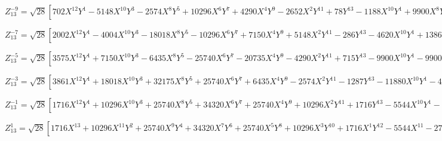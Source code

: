 \documentclass[10pt,landscape]{article}
\begin{document}
\vspace{1.2 mm}
\noindent $ Z^{-9}_{13} = \sqrt{28} [702X^{12}Y^{1} -5148X^{10}Y^{3} -2574X^{8}Y^{5} +10296X^{6}Y^{7} +4290X^{4}Y^{9} -2652X^{2}Y^{11} +78Y^{13} -1188X^{10}Y^{1} +9900X^{8}Y^{3} -5544X^{6}Y^{5} -11880X^{4}Y^{7} +4620X^{2}Y^{9} -132Y^{11} +495X^{8}Y^{1} -4620X^{6}Y^{3} +6930X^{4}Y^{5} -1980X^{2}Y^{7} +55Y^{9}] $

\vspace{1.2 mm}
\noindent $ Z^{-7}_{13} = \sqrt{28} [2002X^{12}Y^{1} -4004X^{10}Y^{3} -18018X^{8}Y^{5} -10296X^{6}Y^{7} +7150X^{4}Y^{9} +5148X^{2}Y^{11} -286Y^{13} -4620X^{10}Y^{1} +13860X^{8}Y^{3} +27720X^{6}Y^{5} -3960X^{4}Y^{7} -12540X^{2}Y^{9} +660Y^{11} +3465X^{8}Y^{1} -13860X^{6}Y^{3} -6930X^{4}Y^{5} +9900X^{2}Y^{7} -495Y^{9} -840X^{6}Y^{1} +4200X^{4}Y^{3} -2520X^{2}Y^{5} +120Y^{7}] $

\vspace{1.2 mm}
\noindent $ Z^{-5}_{13} = \sqrt{28} [3575X^{12}Y^{1} +7150X^{10}Y^{3} -6435X^{8}Y^{5} -25740X^{6}Y^{7} -20735X^{4}Y^{9} -4290X^{2}Y^{11} +715Y^{13} -9900X^{10}Y^{1} -9900X^{8}Y^{3} +27720X^{6}Y^{5} +43560X^{4}Y^{7} +13860X^{2}Y^{9} -1980Y^{11} +9900X^{8}Y^{1} -27720X^{4}Y^{5} -15840X^{2}Y^{7} +1980Y^{9} -4200X^{6}Y^{1} +4200X^{4}Y^{3} +7560X^{2}Y^{5} -840Y^{7} +630X^{4}Y^{1} -1260X^{2}Y^{3} +126Y^{5}] $

\vspace{1.2 mm}
\noindent $ Z^{-3}_{13} = \sqrt{28} [3861X^{12}Y^{1} +18018X^{10}Y^{3} +32175X^{8}Y^{5} +25740X^{6}Y^{7} +6435X^{4}Y^{9} -2574X^{2}Y^{11} -1287Y^{13} -11880X^{10}Y^{1} -43560X^{8}Y^{3} -55440X^{6}Y^{5} -23760X^{4}Y^{7} +3960X^{2}Y^{9} +3960Y^{11} +13860X^{8}Y^{1} +36960X^{6}Y^{3} +27720X^{4}Y^{5} -4620Y^{9} -7560X^{6}Y^{1} -12600X^{4}Y^{3} -2520X^{2}Y^{5} +2520Y^{7} +1890X^{4}Y^{1} +1260X^{2}Y^{3} -630Y^{5} -168X^{2}Y^{1} +56Y^{3}] $

\vspace{1.2 mm}
\noindent $ Z^{-1}_{13} = \sqrt{28} [1716X^{12}Y^{1} +10296X^{10}Y^{3} +25740X^{8}Y^{5} +34320X^{6}Y^{7} +25740X^{4}Y^{9} +10296X^{2}Y^{11} +1716Y^{13} -5544X^{10}Y^{1} -27720X^{8}Y^{3} -55440X^{6}Y^{5} -55440X^{4}Y^{7} -27720X^{2}Y^{9} -5544Y^{11} +6930X^{8}Y^{1} +27720X^{6}Y^{3} +41580X^{4}Y^{5} +27720X^{2}Y^{7} +6930Y^{9} -4200X^{6}Y^{1} -12600X^{4}Y^{3} -12600X^{2}Y^{5} -4200Y^{7} +1260X^{4}Y^{1} +2520X^{2}Y^{3} +1260Y^{5} -168X^{2}Y^{1} -168Y^{3} +7Y^{1}] $

\vspace{1.2 mm}
\noindent $ Z^{1}_{13} = \sqrt{28} [1716X^{13} +10296X^{11}Y^{2} +25740X^{9}Y^{4} +34320X^{7}Y^{6} +25740X^{5}Y^{8} +10296X^{3}Y^{10} +1716X^{1}Y^{12} -5544X^{11} -27720X^{9}Y^{2} -55440X^{7}Y^{4} -55440X^{5}Y^{6} -27720X^{3}Y^{8} -5544X^{1}Y^{10} +6930X^{9} +27720X^{7}Y^{2} +41580X^{5}Y^{4} +27720X^{3}Y^{6} +6930X^{1}Y^{8} -4200X^{7} -12600X^{5}Y^{2} -12600X^{3}Y^{4} -4200X^{1}Y^{6} +1260X^{5} +2520X^{3}Y^{2} +1260X^{1}Y^{4} -168X^{3} -168X^{1}Y^{2} +7X^{1}] $
\end{document}
